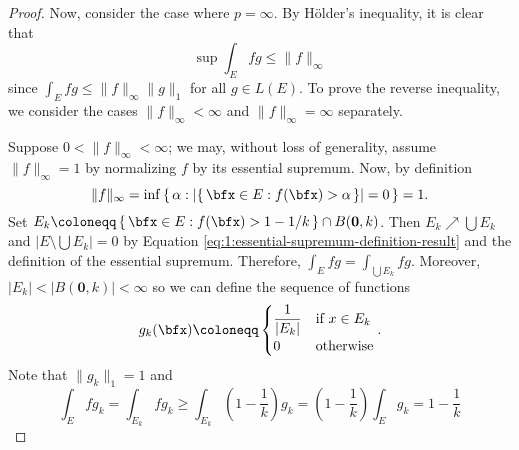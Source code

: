 \begin{proof}
Now, consider the case where $p=\infty$. By Hölder's inequality, it is
clear that
\begin{equation}
\label{eq:1:holders-app-2}
\sup \int_E fg\leq \|f\|_\infty
\end{equation}
since $\int_E fg\leq \|f\|_\infty\|g\|_1$ for all $g\in L(E)$. To prove the
reverse inequality, we consider the cases $\|f\|_\infty<\infty$ and
$\|f\|_\infty=\infty$ separately.

Suppose $0<\|f\|_\infty<\infty$; we may, without loss of generality, assume
$\|f\|_\infty=1$ by normalizing $f$ by its essential supremum. Now, by
definition
\begin{equation}
\label{eq:1:essential-supremum-definition-result}
\|f\|_\infty=\inf\left\{\,\alpha:\left|\left\{\,\bfx\in
      E:f(\bfx)>\alpha\,\right\}\right|=0\,\right\}=1.
\end{equation}
Set $E_k\coloneqq\left\{\,\bfx\in
  E:\text{$f(\bfx)>1-1/k$}\,\right\}\cap B(\mathbf{0},k)$. Then
$E_k\nearrow\bigcup E_k$ and $\left|E\setminus\bigcup E_k\right|=0$ by
Equation \eqref{eq:1:essential-supremum-definition-result} and the
definition of the essential supremum. Therefore, $\int_E fg=\int_{\bigcup
  E_k}fg$. Moreover, $|E_k|<|B(\mathbf{0},k)|<\infty$ so we can define the
sequence of functions
\begin{equation}
  \label{eq:1:special-g}
g_k(\bfx)\coloneqq
\begin{cases}
{\displaystyle\frac{1}{|E_k|}}&\text{if $x\in E_k$}\\
0&\text{otherwise}
\end{cases}.
\end{equation}
Note that $\|g_k\|_1=1$ and
\[
\int_E
fg_k=\int_{E_k}fg_k\geq\int_{E_k}\left(1-\frac{1}{k}\right)g_k
=\left(1-\frac{1}{k}\right)\int_E g_k=1-\frac{1}{k}
\]
\end{proof}


\newpage

